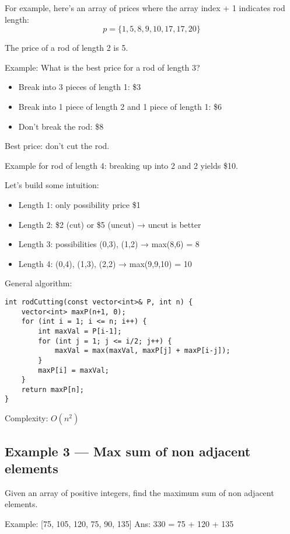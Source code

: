 \documentclass{article}
\begin{document}
For example, here’s an array of prices where the array index + 1 indicates rod length:
\[
p = \{1, 5, 8, 9, 10, 17, 17, 20\}
\]

The price of a rod of length 2 is 5.

Example: What is the best price for a rod of length 3?

\begin{itemize}
    \item Break into 3 pieces of length 1: \$3
    \item Break into 1 piece of length 2 and 1 piece of length 1: \$6
    \item Don't break the rod: \$8
\end{itemize}

Best price: don't cut the rod.

Example for rod of length 4: breaking up into 2 and 2 yields \$10.

Let's build some intuition:

\begin{itemize}
    \item Length 1: only possibility price \$1
    \item Length 2: \$2 (cut) or \$5 (uncut) → uncut is better
    \item Length 3: possibilities (0,3), (1,2) → max(8,6) = 8
    \item Length 4: (0,4), (1,3), (2,2) → max(9,9,10) = 10
\end{itemize}

General algorithm:

\begin{lstlisting}[style=cppstyle]
int rodCutting(const vector<int>& P, int n) {
    vector<int> maxP(n+1, 0);
    for (int i = 1; i <= n; i++) {
        int maxVal = P[i-1];
        for (int j = 1; j <= i/2; j++) {
            maxVal = max(maxVal, maxP[j] + maxP[i-j]);
        }
        maxP[i] = maxVal;
    }
    return maxP[n];
}
\end{lstlisting}

Complexity: \(O(n^2)\)

\subsection*{Example 3 — Max sum of non adjacent elements}

Given an array of positive integers, find the maximum sum of non adjacent elements.

Example: [75, 105, 120, 75, 90, 135]  
Ans: 330 = 75 + 120 + 135
\end{document}
